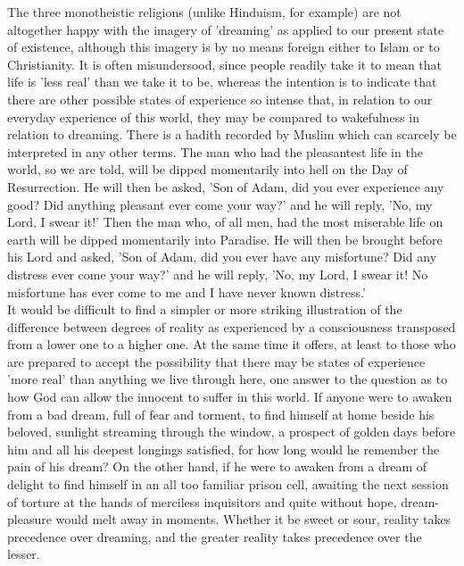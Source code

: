 \documentclass[11pt, b5paper, twoside]{book}
\begin{document}
The three monotheistic religions (unlike Hinduism, for example) are not altogether happy with the 
imagery of 'dreaming' as applied to our present state of existence, although this imagery is by no 
means foreign either to Islam or to Christianity. It is often misundersood, since people readily take 
it to mean that life is 'less real' than we take it to be, whereas the intention is to indicate that 
there are other possible states of experience so intense that, in relation to our everyday experience 
of this world, they may be compared to wakefulness in relation to dreaming. There is a hadith 
recorded by Muslim which can scarcely be interpreted in any other terms. The man who had the 
pleasantest life in the world, so we are told, will be dipped momentarily into hell on the Day of 
Resurrection. He will then be asked, 'Son of Adam, did you ever experience any good? Did anything 
pleasant ever come your way?' and he will reply, 'No, my Lord, I swear it!' Then the man who, of all 
men, had the most miserable life on earth will be dipped momentarily into Paradise. He will then be 
brought before his Lord and asked, 'Son of Adam, did you ever have any misfortune? Did any distress 
ever come your way?' and he will reply, 'No, my Lord, I swear it! No misfortune has ever come to me 
and I have never known distress.' \\

It would be difficult to find a simpler or more striking illustration of the difference between 
degrees of reality as experienced by a consciousness transposed from a lower one to a higher one. At 
the same time it offers, at least to those who are prepared to accept the possibility that there may 
be states of experience 'more real' than anything we live through here, one answer to the question as 
to how God can allow the innocent to suffer in this world. If anyone were to awaken from a bad dream, 
full of fear and torment, to find himself at home beside his beloved, sunlight streaming through the 
window, a prospect of golden days before him and all his deepest longings satisfied, for how long 
would he remember the pain of his dream? On the other hand, if he were to awaken from a dream of 
delight to find himself in an all too familiar prison cell, awaiting the next session of torture at 
the hands of merciless inquisitors and quite without hope, dream-pleasure would melt away in moments. 
Whether it be sweet or sour, reality takes precedence over dreaming, and the greater reality takes 
precedence over the lesser. \\
\end{document}
